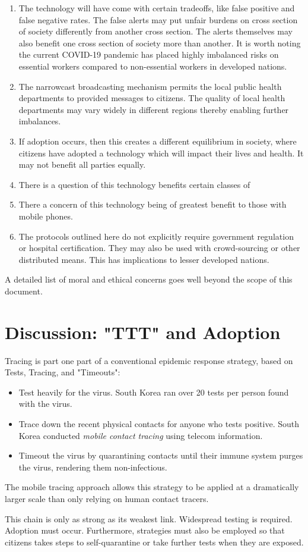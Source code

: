 \documentclass{article}
\begin{document}
\begin{enumerate}
\item The technology will have come with certain tradeoffs, like false positive and false negative rates.  The false alerts may put unfair burdens on cross section of society differently from another cross section.  The alerts themselves may also benefit one cross section of society more than another. It is worth noting the current COVID-19 pandemic has placed highly imbalanced risks on essential workers compared to non-essential workers in developed nations.
\item The narrowcast broadcasting mechanism permits the local public health departments to provided messages to citizens. The quality of local health departments may vary widely in different regions thereby enabling further imbalances.
\item If adoption occurs, then this creates a different equilibrium in society, where citizens have adopted a technology which will impact their lives and health. It may not benefit all parties equally.
\item There is a question of this technology benefits certain classes of 
\item There a concern of this technology being of greatest benefit to those with mobile phones.
\item The protocols outlined here do not explicitly require government regulation or hospital certification. They may also be used with crowd-sourcing or other distributed means. This has implications to lesser developed nations.
\end{enumerate}

A detailed list of moral and ethical concerns goes well beyond the scope of this document. 

\section{Discussion: "TTT" and Adoption}
Tracing is part one part of a conventional epidemic response strategy, based on Tests, Tracing, and "Timeouts": 
\begin{itemize}
\item Test heavily for the virus.  South Korea ran over 20 tests per person found with the virus. 
\item Trace down the recent physical contacts for anyone who tests positive.  South Korea conducted \emph{mobile contact tracing} using telecom information.
\item Timeout the virus by quarantining contacts until their immune system purges the virus, rendering them non-infectious.
\end{itemize}
The mobile tracing approach allows this strategy to be applied at a dramatically larger scale than only relying on human contact tracers.  

This chain is only as strong as its weakest link.  Widespread testing is required.  Adoption must occur. Furthermore, strategies must also be employed so that citizens takes steps to self-quarantine or take further tests when they are exposed.
\end{document}

